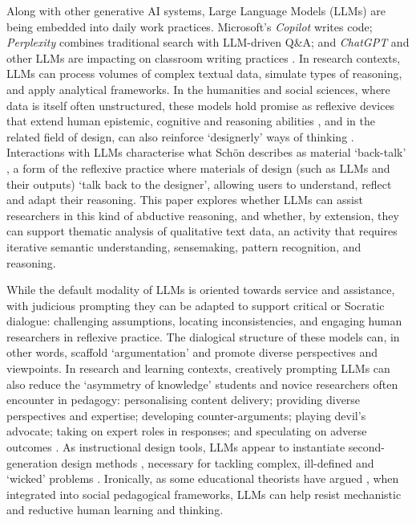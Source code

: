 \documentclass{article}
\begin{document}
Along with other generative AI systems, Large Language Models (LLMs) are being embedded into daily work practices. Microsoft's \emph{Copilot} writes code; \emph{Perplexity} combines traditional search with LLM-driven Q\&A; and \emph{ChatGPT} and other LLMs are impacting on classroom writing practices \cite{zhao2024chatgpt}. In research contexts, LLMs can process volumes of complex textual data, simulate types of reasoning, and apply analytical frameworks. In the humanities and social sciences, where data is itself often unstructured, these models hold promise as reflexive devices that extend human epistemic, cognitive and reasoning abilities \cite{humphreysExtendingOurselvesComputational2004, gedenrydHowDesignersWork1998}, and in the related field of design, can also reinforce `designerly' ways of thinking \cite{crossDesignerlyWaysKnowing1982, lawsonHowDesignersThink2005}. Interactions with LLMs characterise what Schön describes as material `back-talk' \cite{schonReflectivePractitionerHow1983}, a form of the reflexive practice where materials of design (such as LLMs and their outputs) `talk back to the designer', allowing users to understand, reflect and adapt their reasoning. This paper explores whether LLMs can assist researchers in this kind of abductive reasoning, and whether, by extension, they can support thematic analysis \cite{braunUsingThematicAnalysis2006} of qualitative text data, an activity that requires iterative semantic understanding, sensemaking, pattern recognition, and reasoning. 

While the default modality of LLMs is oriented towards service and assistance, with judicious prompting they can be adapted to support critical or Socratic dialogue: challenging assumptions, locating inconsistencies, and engaging human researchers in reflexive practice. The dialogical structure of these models can, in other words, scaffold `argumentation' \cite{rittelSecondGenerationDesignMethods1984} and promote diverse perspectives and viewpoints. In research and learning contexts, creatively prompting LLMs can also reduce the `asymmetry of knowledge' \cite{rittelSecondGenerationDesignMethods1984} students and novice researchers often encounter in pedagogy: personalising content delivery; providing diverse perspectives and expertise; developing counter-arguments; playing devil's advocate; taking on expert roles in responses; and speculating on adverse outcomes \cite{olga2023generative}. As instructional design tools, LLMs appear to instantiate second-generation design methods \cite{rittelDilemmasGeneralTheory1973}, necessary for tackling complex, ill-defined and `wicked' problems \cite{rithWhyHorstWJ2007, rittelDilemmasGeneralTheory1973}. Ironically, as some educational theorists have argued  \cite{cope2023cyber}, when integrated into social pedagogical frameworks, LLMs can help resist mechanistic and reductive human learning and thinking.
\end{document}
